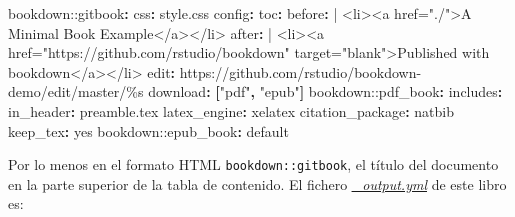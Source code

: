 \documentclass[
]{book}
\newenvironment{Shaded}{\begin{snugshade}}{\end{snugshade}}
\newcommand{\AttributeTok}[1]{\textcolor[rgb]{0.77,0.63,0.00}{#1}}
\newcommand{\CharTok}[1]{\textcolor[rgb]{0.31,0.60,0.02}{#1}}
\newcommand{\FunctionTok}[1]{\textcolor[rgb]{0.00,0.00,0.00}{#1}}
\newcommand{\KeywordTok}[1]{\textcolor[rgb]{0.13,0.29,0.53}{\textbf{#1}}}
\newcommand{\NormalTok}[1]{#1}
\newcommand{\StringTok}[1]{\textcolor[rgb]{0.31,0.60,0.02}{#1}}
\theoremstyle{definition}
\theoremstyle{definition}
\theoremstyle{definition}
\theoremstyle{definition}
\theoremstyle{remark}
\begin{document}
\begin{Shaded}
\begin{Highlighting}[]
\AttributeTok{bookdown:}\FunctionTok{:gitbook}\KeywordTok{:}
\AttributeTok{  }\FunctionTok{css}\KeywordTok{:}\AttributeTok{ style.css}
\AttributeTok{  }\FunctionTok{config}\KeywordTok{:}
\AttributeTok{    }\FunctionTok{toc}\KeywordTok{:}
\FunctionTok{      before}\KeywordTok{: }\CharTok{|}
\NormalTok{        \textless{}li\textgreater{}\textless{}a href="./"\textgreater{}A Minimal Book Example\textless{}/a\textgreater{}\textless{}/li\textgreater{}}
\FunctionTok{      after}\KeywordTok{: }\CharTok{|}
\NormalTok{        \textless{}li\textgreater{}\textless{}a href="https://github.com/rstudio/bookdown" target="blank"\textgreater{}Published with bookdown\textless{}/a\textgreater{}\textless{}/li\textgreater{}}
\AttributeTok{    }\FunctionTok{edit}\KeywordTok{:}\AttributeTok{ https://github.com/rstudio/bookdown{-}demo/edit/master/\%s}
\AttributeTok{    }\FunctionTok{download}\KeywordTok{:}\AttributeTok{ }\KeywordTok{[}\StringTok{"pdf"}\KeywordTok{,}\AttributeTok{ }\StringTok{"epub"}\KeywordTok{]}
\AttributeTok{bookdown:}\FunctionTok{:pdf\_book}\KeywordTok{:}
\AttributeTok{  }\FunctionTok{includes}\KeywordTok{:}
\AttributeTok{    }\FunctionTok{in\_header}\KeywordTok{:}\AttributeTok{ preamble.tex}
\AttributeTok{  }\FunctionTok{latex\_engine}\KeywordTok{:}\AttributeTok{ xelatex}
\AttributeTok{  }\FunctionTok{citation\_package}\KeywordTok{:}\AttributeTok{ natbib}
\AttributeTok{  }\FunctionTok{keep\_tex}\KeywordTok{:}\AttributeTok{ }\CharTok{yes}
\AttributeTok{bookdown:}\FunctionTok{:epub\_book}\KeywordTok{:}\AttributeTok{ default}
\end{Highlighting}
\end{Shaded}

Por lo menos en el formato HTML \texttt{bookdown::gitbook}, el título del documento en la parte superior de la tabla de contenido.
El fichero \href{https://github.com/rubenfcasal/bookdown_intro/blob/master/_output.yml}{\emph{\_output.yml}} de este libro es:
\end{document}

